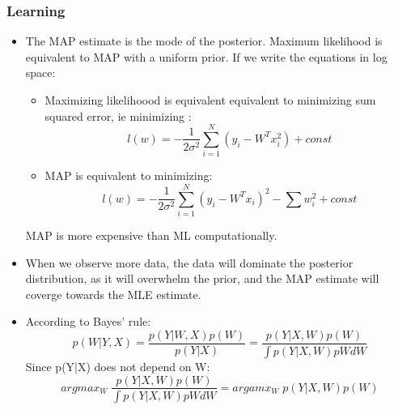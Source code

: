 \documentclass[a4paper,11pt]{article}
\theoremstyle{mytheor}
\begin{document}
\subsubsection{Learning}
\smallskip
\begin{itemize}
\item The MAP estimate is the mode of the posterior. Maximum likelihood is equivalent to MAP with a
uniform prior. If we write the equations in log space:
\begin{itemize}
\item Maximizing likelihoood is equivalent equivalent to minimizing sum squared error, ie minimizing :
\begin{equation*}
l(w) = -\frac{1}{2\sigma^2}\sum\limits_{i = 1}^{N}(y_i-W^Tx_i^2) + const
\end{equation*}
\item MAP is equivalent to minimizing:
\begin{equation*}
l(w) = -\frac{1}{2\sigma^2}\sum\limits_{i = 1}^{N}(y_i-W^Tx_i)^2 -\sum w_i^2 + const
\end{equation*}
\end{itemize}
MAP is more expensive than ML computationally.
\item When we observe more data, the data will dominate the posterior distribution, as it will overwhelm the prior, and the MAP estimate will coverge towards the MLE estimate.
\item According to Bayes' rule:
\begin{equation*}
p(W|Y,X) = \frac{p(Y|W,X)p(W)}{p(Y|X)} = \frac{p(Y|X,W)p(W)}{\int p(Y|X,W)pWdW}
\end{equation*}
Since p(Y|X) does not depend on W:
\begin{equation*}
argmax_W \;\frac{p(Y|X,W)p(W)}{\int p(Y|X,W)pWdW} = argamx_W \; p(Y|X,W)p(W)
\end{equation*}
\end{itemize}
\smallskip
{}
\end{document}
